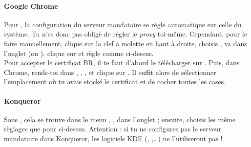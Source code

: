 


\paragraph{Google Chrome}

Pour , la configuration du serveur mandataire se r\`egle automatique sur celle du système. Tu n'es donc pas oblig\`e de r\`egler le \emph{proxy} toi-même. Cependant, pour le faire manuellement, clique sur la
clef à molette en haut à droite, choisis , va dans l'onglet  (ou ), clique sur  et règle comme ci-dessus.\\

Pour accepter le certificat BR, il te faut d'abord le t\'el\'echarger sur .
Puis, dans Chrome, rends-toi dans , , ,
 et clique sur . Il suffit alors de s\'electionner l'emplacement o\`u tu avais stock\'e le certificat et de cocher toutes les cases.

\paragraph{Konqueror}

Sous , cela se trouve dans le menu , ,
dans l'onglet  ; ensuite, choisis les même r\`eglages que pour  ci-dessus.
Attention : si tu ne configures pas le serveur mandataire dans Konqueror,
les logiciels KDE (, ,\dots) ne l'utiliseront pas !




